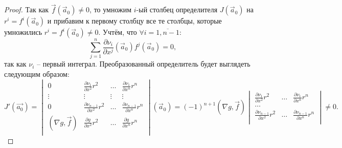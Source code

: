 \begin{proof}
    Так как $\vec{f} \left( \vec{a}_0 \right) \neq 0$, то умножим $i$-ый столбец определителя $J \left( \vec{a}_0 \right)$ на $r^i = f^i \left( \vec{a}_0 \right)$ и прибавим к первому столбцу все те столбцы, которые умножились $r^i = f^i \left( \vec{a}_0 \right) \neq 0$. Учтём, что $\forall i = \overline{1, n - 1}$:
    \begin{equation*}
        \sum \limits_{j = 1}^n \frac{\partial \nu_i}{\partial x^j} \left( \vec{a}_0 \right) f^j \left( \vec{a}_0 \right) = 0,
    \end{equation*}
    так как $\nu_i$ -- первый интеграл. 
    Преобразованный определитель будет выглядеть следующим образом:
    \begin{equation*}
        J' \left( \vec{a_0} \right) =
        \begin{vmatrix}
            0 & \frac{\partial \nu_1}{\partial x^2} r^2 & \dots & \frac{\partial \nu_1}{\partial x^n} r^n                                           \\
            \vdots & \vdots & \vdots & \vdots                                                                                                                              \\
            0 & \frac{\partial \nu_{n - 1}}{\partial x^2} r^2 & \dots & \frac{\partial \nu_{n - 1}}{\partial x^n} r^n                               \\
            \left( \nabla g, \vec{f} \right) & \frac{\partial g}{\partial x^2} r^2 & \dots & \frac{\partial g}{\partial x^n} r^n \\
        \end{vmatrix}  \left( \vec{a}_0 \right) = \left( -1 \right)^{n + 1} \left( \nabla g, \vec{f} \right)
        \begin{vmatrix}
            \frac{\partial \nu_1}{\partial x^2} r^2 & \dots & \frac{\partial \nu_1}{\partial x^n} r^n             \\
            \dots                                                                                                 \\
            \frac{\partial \nu_{n - 1}}{\partial x^2} r^2 & \dots & \frac{\partial \nu_{n - 1}}{\partial x^n} r^n \\
        \end{vmatrix} \neq 0.
    \end{equation*}


\end{proof}
